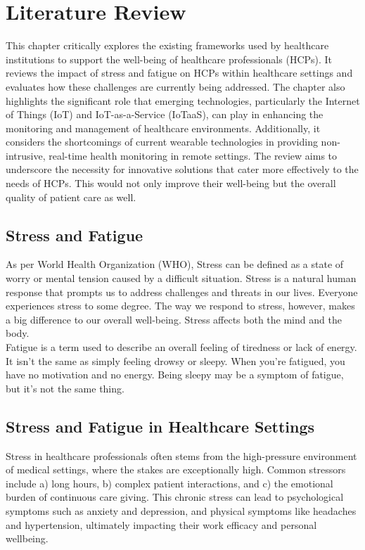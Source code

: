 \newpage
\chapter{Literature Review}

This chapter critically explores the existing frameworks used by healthcare institutions to support the well-being of healthcare professionals (HCPs). It reviews the impact of stress and fatigue on HCPs within healthcare settings and evaluates how these challenges are currently being addressed. The chapter also highlights the significant role that emerging technologies, particularly the Internet of Things (IoT) and IoT-as-a-Service (IoTaaS), can play in enhancing the monitoring and management of healthcare environments. Additionally, it considers the shortcomings of current wearable technologies in providing non-intrusive, real-time health monitoring in remote settings. The review aims to underscore the necessity for innovative solutions that cater more effectively to the needs of HCPs. This would not only improve their well-being but the overall quality of patient care as well.

\section{Stress and Fatigue}

As per World Health Organization (WHO), Stress can be defined as a state of worry or mental tension caused by a difficult situation. Stress is a natural human response that prompts us to address challenges and threats in our lives. Everyone experiences stress to some degree. The way we respond to stress, however, makes a big difference to our overall well-being. Stress affects both the mind and the body. \cite{48} \\

\noindent Fatigue is a term used to describe an overall feeling of tiredness or lack of energy. It isn’t the same as simply feeling drowsy or sleepy. When you’re fatigued, you have no motivation and no energy. Being sleepy may be a symptom of fatigue, but it’s not the same thing. \cite{49}

\section{Stress and Fatigue in Healthcare Settings}
Stress in healthcare professionals often stems from the high-pressure environment of medical settings, where the stakes are exceptionally high. Common stressors include a) long hours, b) complex patient interactions, and c) the emotional burden of continuous care giving. This chronic stress can lead to psychological symptoms such as anxiety and depression, and physical symptoms like headaches and hypertension, ultimately impacting their work efficacy and personal wellbeing. \\ 

